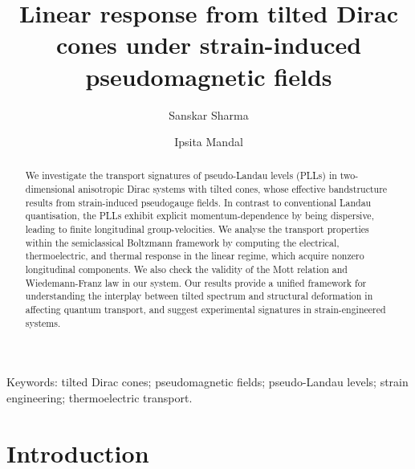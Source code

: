 \documentclass[aps,prb, onecolumn, nofootinbib, citeautoscript,10pt]{revtex4-2}
\begin{document}
\title{Linear response from tilted Dirac cones under strain-induced pseudomagnetic fields}



\author{Sanskar Sharma}
\author{Ipsita Mandal}



\begin{abstract}
We investigate the transport signatures of pseudo-Landau levels (PLLs) in two-dimensional anisotropic Dirac systems with tilted cones, whose effective bandstructure results from strain-induced pseudogauge fields. In contrast to conventional Landau quantisation, the PLLs exhibit explicit momentum-dependence by being dispersive, leading to finite longitudinal group-velocities. We analyse the transport properties within the semiclassical Boltzmann framework by computing the electrical, thermoelectric, and thermal response in the linear regime, which acquire nonzero longitudinal components. We also check the validity of the Mott relation and Wiedemann-Franz law in our system. Our results provide a unified framework for understanding the interplay between tilted spectrum and structural deformation in affecting quantum transport, and suggest experimental signatures in strain-engineered systems.
\end{abstract}


\maketitle

\vspace{0.5em}
\noindent Keywords: tilted Dirac cones; pseudomagnetic fields; pseudo-Landau levels; strain engineering; thermoelectric transport.

\tableofcontents



\section{Introduction}
\end{document}

